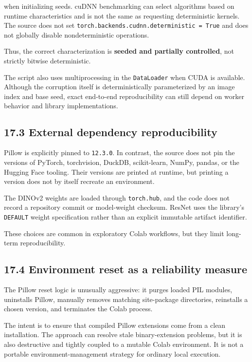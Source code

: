 \documentclass[
  11pt,
]{article}
\begin{document}
when initializing seeds. cuDNN benchmarking can select algorithms based
on runtime characteristics and is not the same as requesting
deterministic kernels. The source does not set
\texttt{torch.backends.cudnn.deterministic\ =\ True} and does not
globally disable nondeterministic operations.

Thus, the correct characterization is \textbf{seeded and partially
controlled}, not strictly bitwise deterministic.

The script also uses multiprocessing in the \texttt{DataLoader} when
CUDA is available. Although the corruption itself is deterministically
parameterized by an image index and base seed, exact end-to-end
reproducibility can still depend on worker behavior and library
implementations.

\subsection{17.3 External dependency
reproducibility}\label{external-dependency-reproducibility}

Pillow is explicitly pinned to \texttt{12.3.0}. In contrast, the source
does not pin the versions of PyTorch, torchvision, DuckDB, scikit-learn,
NumPy, pandas, or the Hugging Face tooling. Their versions are printed
at runtime, but printing a version does not by itself recreate an
environment.

The DINOv2 weights are loaded through \texttt{torch.hub}, and the code
does not record a repository commit or model-weight checksum. ResNet
uses the library's \texttt{DEFAULT} weight specification rather than an
explicit immutable artifact identifier.

These choices are common in exploratory Colab workflows, but they limit
long-term reproducibility.

\subsection{17.4 Environment reset as a reliability
measure}\label{environment-reset-as-a-reliability-measure}

The Pillow reset logic is unusually aggressive: it purges loaded PIL
modules, uninstalls Pillow, manually removes matching site-package
directories, reinstalls a chosen version, and terminates the Colab
process.

The intent is to ensure that compiled Pillow extensions come from a
clean installation. The approach can resolve stale binary-extension
problems, but it is also destructive and tightly coupled to a mutable
Colab environment. It is not a portable environment-management strategy
for ordinary local execution.
\end{document}
